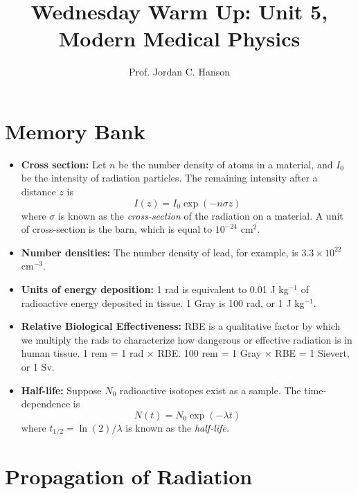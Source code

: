 \documentclass{article}
\begin{document}
\twocolumn

\title{Wednesday Warm Up: Unit 5, Modern Medical Physics}
\author{Prof. Jordan C. Hanson}

\maketitle

\section{Memory Bank}

\begin{itemize}
\item \textbf{Cross section:} Let $n$ be the number density of atoms in a material, and $I_0$ be the intensity of radiation particles.  The remaining intensity after a distance $z$ is 
\begin{equation}
I(z) = I_0 \exp(-n\sigma z)
\end{equation}
where $\sigma$ is known as the \textit{cross-section} of the radiation on a material. A unit of cross-section is the barn, which is equal to $10^{-24}$ cm$^2$.
\item \textbf{Number densities:} The number density of lead, for example, is $3.3 \times 10^{22}$ cm$^{-3}$.
\item \textbf{Units of energy deposition:} 1 rad is equivalent to 0.01 J kg$^{-1}$ of radioactive energy deposited in tissue.  1 Gray is 100 rad, or 1 J kg$^{-1}$.
\item \textbf{Relative Biological Effectiveness:} RBE is a qualitative factor by which we multiply the rads to characterize how dangerous or effective radiation is in human tissue.  1 rem = 1 rad $\times$ RBE.  100 rem = 1 Gray $\times$ RBE = 1 Sievert, or 1 Sv.
\item \textbf{Half-life:} Suppose $N_0$ radioactive isotopes exist as a sample.  The time-dependence is 
\begin{equation}
N(t) = N_0 \exp(-\lambda t)
\end{equation}
where $t_{1/2} = \ln(2)/\lambda$ is known as the \textit{half-life.}
\end{itemize}

\section{Propagation of Radiation}
\end{document}
